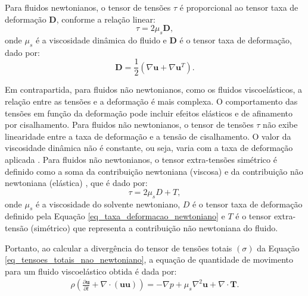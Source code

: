 Para fluidos newtonianos, o tensor de tensões $\tau$ é proporcional ao tensor taxa de deformação $\mathbf{D}$, conforme a relação linear:
\begin{equation}\label{eq_tensoes_totais_newtoniano}
    \tau = 2 \mu_s \mathbf{D},
\end{equation}
onde $\mu_s$ é a viscosidade dinâmica do fluido e $\mathbf{D}$ é o tensor taxa de deformação, dado por:
\begin{equation}\label{eq_taxa_deformacao_newtoniano}
    \mathbf{D} = \frac{1}{2}(\nabla \mathbf{u} + \nabla\mathbf{u}^{T} ).
\end{equation}

Em contrapartida, para fluidos não newtonianos, como os fluidos viscoelásticos, a relação entre as tensões e a deformação é mais complexa. O comportamento das tensões em função da deformação pode incluir efeitos elásticos e de afinamento por cisalhamento. Para fluidos não newtonianos, o tensor de tensões $\tau$ não exibe linearidade entre a taxa de deformação e a tensão de cisalhamento. O valor da viscosidade dinâmica não é constante, ou seja, varia com a taxa de deformação aplicada \cite{tanner1988}. Para fluidos não newtonianos, o tensor extra-tensões simétrico é definido como a soma da contribuição newtoniana (viscosa) e da contribuição não newtoniana (elástica) \cite{RAJAGOPALAN1990}, que é dado por:
\begin{equation}\label{eq_tensoes_totais_nao_newtoniano}
    \tau=2 \mu_s D+T,
\end{equation}
onde $\mu_s$ é a viscosidade do solvente newtoniano, $D$ é o tensor taxa de deformação definido pela Equação \eqref{eq_taxa_deformacao_newtoniano} e $T$ é o tensor extra-tensão (simétrico) que representa a contribuição não newtoniana do fluido.

Portanto, ao calcular a divergência do tensor de tensões totais $(\sigma)$ da Equação \eqref{eq_tensoes_totais_nao_newtoniano}, a equação de quantidade de movimento para um fluido viscoelástico obtida é dada por:
\begin{equation}
    \begin{split}
        \rho \left( \frac{\partial \mathbf{u}}{\partial t} + \nabla \cdot (\mathbf{uu}) \right) = -\nabla p + \mu_s \nabla^2 \mathbf{u} + \nabla \cdot \mathbf{T}.
    \end{split}\label{eq_conservacao_momentum_nao_newtoniano}
\end{equation}


